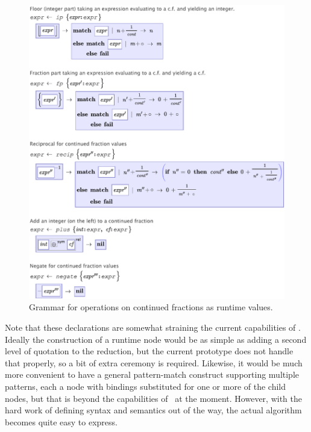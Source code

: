 \begin{figure}[h]
  \begin{center}
    
  \includegraphics[scale=0.6]{src/image/continued-ops.pdf}
  
  \end{center}
  \caption{Grammar for operations on continued fractions as runtime values.}
  \label{fig-cf}
\end{figure}

Note that these declarations are somewhat straining the current capabilities of \Meta. Ideally the construction of a runtime node would be as simple as adding a second level of quotation to the  reduction, but the current prototype does not handle that properly, so a bit of extra ceremony is required. Likewise, it would be much more convenient to have a general pattern-match construct supporting multiple patterns, each a node with bindings substituted for one or more of the child nodes, but that is beyond the capabilities of \Meta\ at the moment. However, with the hard work of defining syntax and semantics out of the way, the actual algorithm becomes quite easy to express.

